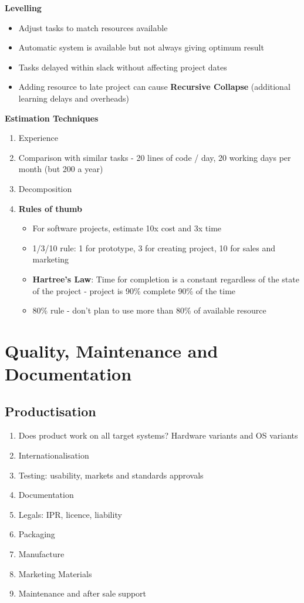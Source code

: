 \documentclass{article}
\begin{document}
\begin{multicols}{2}
\textbf{Levelling}
\begin{itemize}
    \item Adjust tasks to match resources available
    \item Automatic system is available but not always giving optimum result
    \item Tasks delayed within slack without affecting project dates
    \item Adding resource to late project can cause \textbf{Recursive Collapse} (additional learning delays and overheads)
\end{itemize}

\textbf{Estimation Techniques}
\begin{enumerate}
    \item Experience
    \item Comparison with similar tasks - 20 lines of code / day, 20 working days per month (but 200 a year)
    \item Decomposition
    \item \textbf{Rules of thumb}
    \begin{itemize}
        \item For software projects, estimate 10x cost and 3x time
        \item 1/3/10 rule: 1 for prototype, 3 for creating project, 10 for sales and marketing
        \item \textbf{Hartree's Law}: Time for completion is a constant regardless of the state of the project - project is 90\% complete 90\% of the time
        \item 80\% rule - don't plan to use more than 80\% of available resource
    \end{itemize}
\end{enumerate}

\section{Quality, Maintenance and Documentation}
\subsection{Productisation}
\begin{enumerate}
    \item Does product work on all target systems? Hardware variants and OS variants
    \item Internationalisation
    \item Testing: usability, markets and standards approvals
    \item Documentation
    \item Legals: IPR, licence, liability
    \item Packaging
    \item Manufacture
    \item Marketing Materials
    \item Maintenance and after sale support
\end{enumerate}


\end{multicols}
\end{document}
